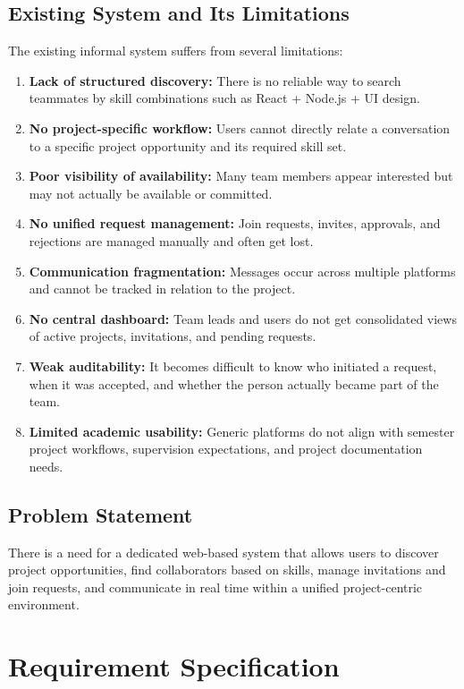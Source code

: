 \documentclass[12pt,a4paper,oneside]{report}
\begin{document}
\subsection{Existing System and Its Limitations}
The existing informal system suffers from several limitations:
\begin{enumerate}[label=\arabic*.]
  \item \textbf{Lack of structured discovery:} There is no reliable way to search teammates by skill combinations such as React + Node.js + UI design.
  \item \textbf{No project-specific workflow:} Users cannot directly relate a conversation to a specific project opportunity and its required skill set.
  \item \textbf{Poor visibility of availability:} Many team members appear interested but may not actually be available or committed.
  \item \textbf{No unified request management:} Join requests, invites, approvals, and rejections are managed manually and often get lost.
  \item \textbf{Communication fragmentation:} Messages occur across multiple platforms and cannot be tracked in relation to the project.
  \item \textbf{No central dashboard:} Team leads and users do not get consolidated views of active projects, invitations, and pending requests.
  \item \textbf{Weak auditability:} It becomes difficult to know who initiated a request, when it was accepted, and whether the person actually became part of the team.
  \item \textbf{Limited academic usability:} Generic platforms do not align with semester project workflows, supervision expectations, and project documentation needs.
\end{enumerate}

\subsection{Problem Statement}
There is a need for a dedicated web-based system that allows users to discover project opportunities, find collaborators based on skills, manage invitations and join requests, and communicate in real time within a unified project-centric environment.

\section{Requirement Specification}
\end{document}
